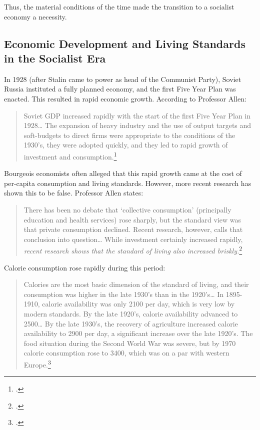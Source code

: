Thus, the material conditions of the time made the transition to a
socialist economy a necessity.

\subsection*{Economic Development and Living Standards in the Socialist
Era}

In 1928 (after Stalin came to power as head of the Communist Party),
Soviet Russia instituted a fully planned economy, and the first Five
Year Plan was enacted. This resulted in rapid economic growth. According
to Professor Allen:

\begin{quote}
Soviet GDP increased rapidly with the start of the first Five Year Plan
in 1928\ldots{} The expansion of heavy industry and the use of output
targets and soft-budgets to direct firms were appropriate to the
conditions of the 1930's, they were adopted quickly, and they led to
  rapid growth of investment and consumption.\footcite{allen2003farm}
\end{quote}

Bourgeois economists often alleged that this rapid growth came at the
cost of per-capita consumption and living standards. However, more
recent research has shown this to be false. Professor Allen states:

\begin{quote}
There has been no debate that `collective consumption' (principally
education and health services) rose sharply, but the standard view was
that private consumption declined. Recent research, however, calls that
conclusion into question\ldots{} While investment certainly increased
rapidly, \emph{recent research shows that the standard of living also
  increased briskly.}\footcite{allen2003farm}
\end{quote}

Calorie consumption rose rapidly during this period:

\begin{quote}
Calories are the most basic dimension of the standard of living, and
their consumption was higher in the late 1930's than in the
1920's\ldots{} In 1895-1910, calorie availability was only 2100 per day,
which is very low by modern standards. By the late 1920's, calorie
availability advanced to 2500\ldots{} By the late 1930's, the recovery
of agriculture increased calorie availability to 2900 per day, a
significant increase over the late 1920's. The food situation during the
Second World War was severe, but by 1970 calorie consumption rose to
  3400, which was on a par with western Europe.\footcite{allen2003farm}
\end{quote}

